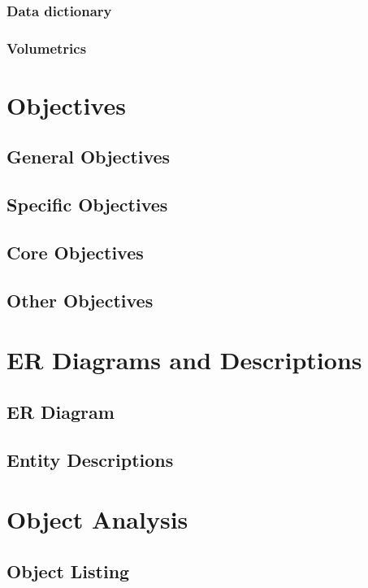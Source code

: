 \subsubsection{Data dictionary}

\subsubsection{Volumetrics}

\section{Objectives}

\subsection{General Objectives}

\subsection{Specific Objectives}

\subsection{Core Objectives}

\subsection{Other Objectives}

\section{ER Diagrams and Descriptions}

\subsection{ER Diagram}

\subsection{Entity Descriptions}

\section{Object Analysis}

\subsection{Object Listing}

